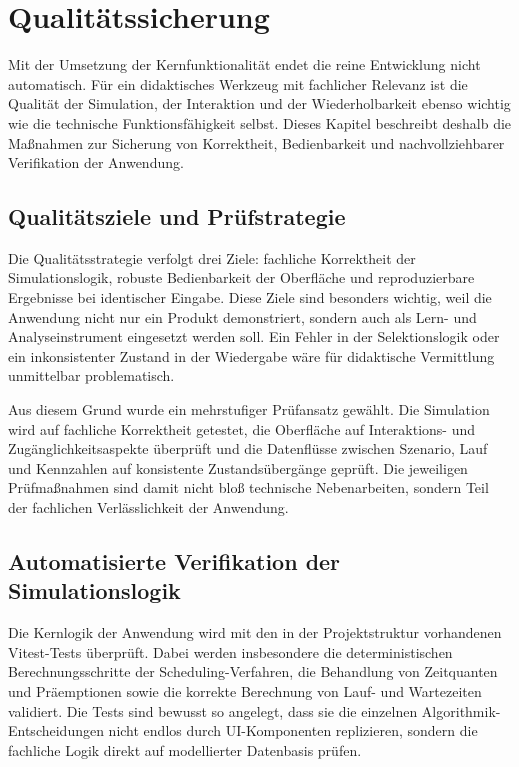 \chapter{Qualitätssicherung}

Mit der Umsetzung der Kernfunktionalität endet die reine Entwicklung nicht automatisch. Für ein didaktisches Werkzeug mit fachlicher Relevanz ist die Qualität der Simulation, der Interaktion und der Wiederholbarkeit ebenso wichtig wie die technische Funktionsfähigkeit selbst. Dieses Kapitel beschreibt deshalb die Maßnahmen zur Sicherung von Korrektheit, Bedienbarkeit und nachvollziehbarer Verifikation der Anwendung.

\section{Qualitätsziele und Prüfstrategie}

Die Qualitätsstrategie verfolgt drei Ziele: fachliche Korrektheit der Simulationslogik, robuste Bedienbarkeit der Oberfläche und reproduzierbare Ergebnisse bei identischer Eingabe. Diese Ziele sind besonders wichtig, weil die Anwendung nicht nur ein Produkt demonstriert, sondern auch als Lern- und Analyseinstrument eingesetzt werden soll. Ein Fehler in der Selektionslogik oder ein inkonsistenter Zustand in der Wiedergabe wäre für didaktische Vermittlung unmittelbar problematisch.

Aus diesem Grund wurde ein mehrstufiger Prüfansatz gewählt. Die Simulation wird auf fachliche Korrektheit getestet, die Oberfläche auf Interaktions- und Zugänglichkeitsaspekte überprüft und die Datenflüsse zwischen Szenario, Lauf und Kennzahlen auf konsistente Zustandsübergänge geprüft. Die jeweiligen Prüfmaßnahmen sind damit nicht bloß technische Nebenarbeiten, sondern Teil der fachlichen Verlässlichkeit der Anwendung.

\section{Automatisierte Verifikation der Simulationslogik}

Die Kernlogik der Anwendung wird mit den in der Projektstruktur vorhandenen Vitest-Tests überprüft. Dabei werden insbesondere die deterministischen Berechnungsschritte der Scheduling-Verfahren, die Behandlung von Zeitquanten und Präemptionen sowie die korrekte Berechnung von Lauf- und Wartezeiten validiert. Die Tests sind bewusst so angelegt, dass sie die einzelnen Algorithmik-Entscheidungen nicht endlos durch UI-Komponenten replizieren, sondern die fachliche Logik direkt auf modellierter Datenbasis prüfen.

